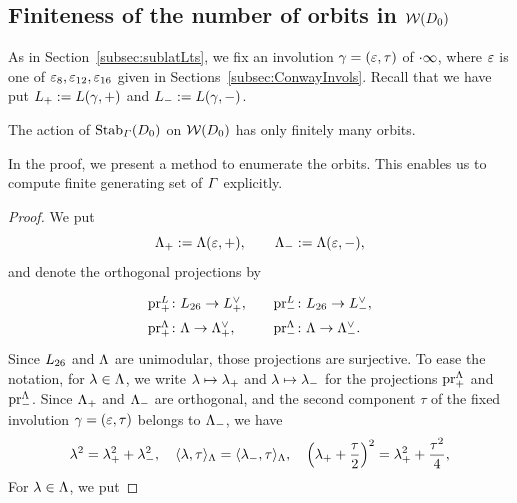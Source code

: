 \documentclass{amsart} %
\begin{document}
\subsection{Finiteness of the number of orbits in $\mathord{\mathcal{W}}(D_0)$}\label{subsec:finite}
%
As in Section~\ref{subsec:sublatLts}, 
we fix an involution $\gamma=(\varepsilon, \tau)$ of $\cdot \infty$,
where $\varepsilon$ is one of $\varepsilon_8, \varepsilon_{12}, \varepsilon_{16}$ 
given in Sections~\ref{subsec:ConwayInvols}.
Recall that we have put $L_{+}:=L(\gamma, +)$
and $L_{-}:=L(\gamma, -)$.
%
\begin{theorem}
The action of  $\operatorname{Stab}_{\varGamma}(D_0)$ on $\mathord{\mathcal{W}}(D_0)$ has only finitely many  orbits.
\end{theorem}
%
In the proof,
we present a method to enumerate the orbits.
This enables us to compute finite generating set of $\varGamma$
explicitly.
%
\begin{proof}
We put
\[
\Lambda_{+}:=\Lambda(\varepsilon, +),
\qquad
\Lambda_{-}:=\Lambda(\varepsilon,-), 
\]
and denote the orthogonal projections by
%
\[
\renewcommand{\arraystretch}{1.5}
\begin{array}{lll}
\prLplus \colon\Lts\to \Lplus\dual, &&
\prLminus\colon \Lts\to \Lminus\dual,\\
\prLeechplus\colon \Leech\to \Leechplus\dual, &&
\prLeechminus\colon\Leech\to \Leechminus\dual.
\end{array}
\]
%
Since $L_{26}$ and $\Lambda$ are unimodular, 
those projections are surjective.
%
%
%
%
To ease the notation, for $\lambda\in \Lambda$, 
we write $\lambda\mapsto {\lambda}_{+}$ and $\lambda\mapsto {\lambda}_{-}$ 
for the projections $\operatorname{pr}^{\Lambda}_{+}$ and $\operatorname{pr}^{\Lambda}_{-}$.
Since  $\Lambda_{+}$ and $ \Lambda_{-}$ are orthogonal, and 
the second component $\tau$ of 
the fixed involution $\gamma=(\varepsilon, \tau)$ belongs to $ \Lambda_{-}$, 
we have 
\[
\lambda^2={\lambda}_{+}^2+{\lambda}_{-}^2,
\quad
\langle \lambda, \tau \rangle_{\Lambda}=\langle {\lambda}_{-}, \tau \rangle_{\Lambda}, 
\quad
\left({\lambda}_{+} +\frac{\tau}{2} \right)^2={\lambda}_{+}^2+\frac{\tau^2}{4}, 
\]
For $\lambda\in \Lambda$, we put

\end{proof}
\end{document}
